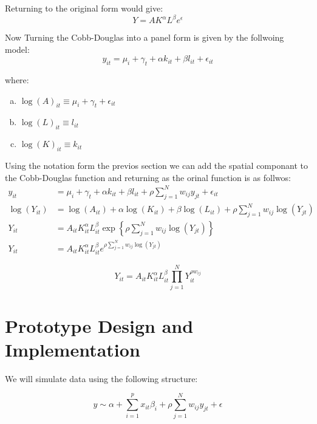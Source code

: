 \documentclass{article}
\begin{document}
Returning to the original form would give:
\begin{equation}
	Y = A K^\alpha L^\beta e^{\epsilon}
\end{equation}

Now Turning the Cobb-Douglas into a panel form is given by the follwoing model:
\begin{equation}
	y_{it} = \mu_i + \gamma_t + \alpha k_{it} + \beta l_{it} + \epsilon_{it}
\end{equation}

where:
\begin{enumerate}[(a)]
	\item $\log(A)_{it} \equiv \mu_i + \gamma_t + \epsilon_{it}$
	\item $\log(L)_{it} \equiv l_{it}$
	\item $\log(K)_{it} \equiv k_{it}$
\end{enumerate}

Using the notation form the previos section we can add the spatial componant to the Cobb-Douglas function and returning as the orinal function is as follwos:
\[
	\begin{split}
		y_{it}       & = \mu_i + \gamma_t + \alpha k_{it} + \beta l_{it} + \rho \sum_{j=1}^N w_{ij} y_{jt} + \epsilon_{it} \\
		\log(Y_{it}) & = \log(A_{it}) + \alpha \log(K_{it}) + \beta \log(L_{it}) + \rho \sum_{j=1}^N w_{ij} \log(Y_{jt})   \\
		Y_{it}       & = A_{it} K^\alpha_{it} L^\beta_{it} \exp \left\{ \rho \sum_{j=1}^N w_{ij} \log(Y_{jt}) \right\}     \\
		Y_{it}       & = A_{it} K^\alpha_{it} L^\beta_{it} e^{\rho \sum_{j=1}^N w_{ij} \log(Y_{jt})}
	\end{split}
\]

\begin{equation}
	Y_{it} = A_{it} K^\alpha_{it} L^\beta_{it} \prod_{j=1}^N Y_{it}^{\rho w_{ij}}
\end{equation}

\section{Prototype Design and Implementation}

We will simulate data using the following structure:

\begin{equation}
	y \sim \alpha + \sum^p_{i=1} x_{it} \beta_i + \rho \sum^N_{j=1} w_{ij} y_{jt} + \epsilon
\end{equation}
\end{document}
